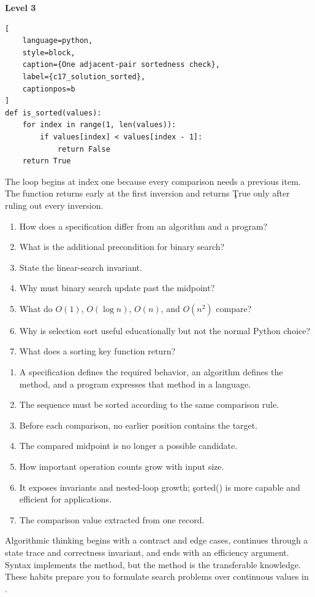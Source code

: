 \textbf{Level 3}

\begin{lstlisting}[
    language=python,
    style=block,
    caption={One adjacent-pair sortedness check},
    label={c17_solution_sorted},
    captionpos=b
]
def is_sorted(values):
    for index in range(1, len(values)):
        if values[index] < values[index - 1]:
            return False
    return True
\end{lstlisting}

The loop begins at index one because every comparison needs a previous item.
The function returns early at the first inversion and returns \c{True} only
after ruling out every inversion.


\begin{enumerate}
    \item How does a specification differ from an algorithm and a program?
    \item What is the additional precondition for binary search?
    \item State the linear-search invariant.
    \item Why must binary search update past the midpoint?
    \item What do $O(1)$, $O(\log n)$, $O(n)$, and $O(n^2)$ compare?
    \item Why is selection sort useful educationally but not the normal Python choice?
    \item What does a sorting key function return?
\end{enumerate}


\begin{enumerate}
    \item A specification defines the required behavior, an algorithm defines
          the method, and a program expresses that method in a language.
    \item The sequence must be sorted according to the same comparison rule.
    \item Before each comparison, no earlier position contains the target.
    \item The compared midpoint is no longer a possible candidate.
    \item How important operation counts grow with input size.
    \item It exposes invariants and nested-loop growth; \c{sorted()} is more
          capable and efficient for applications.
    \item The comparison value extracted from one record.
\end{enumerate}

\begin{tcolorbox}[title=Chapter summary,colframe=orange,colback=white,arc=2mm]
Algorithmic thinking begins with a contract and edge cases, continues through
a state trace and correctness invariant, and ends with an efficiency argument.
Syntax implements the method, but the method is the transferable knowledge.
These habits prepare you to formulate search problems over continuous values
in .
\end{tcolorbox}
